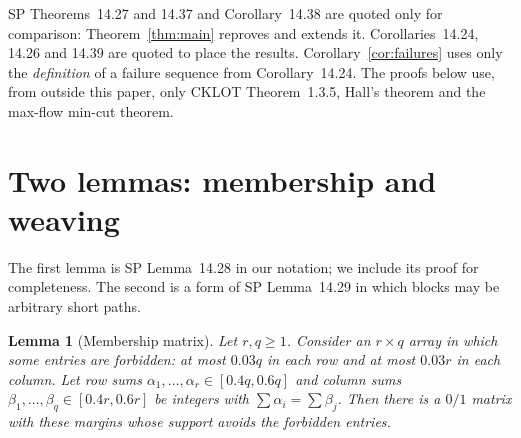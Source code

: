 \documentclass[11pt]{article}
\newtheorem{lemma}[theorem]{Lemma}
\theoremstyle{definition}
\begin{document}
SP Theorems~14.27 and 14.37 and Corollary~14.38 are quoted only for comparison: Theorem~\ref{thm:main} reproves and extends it. Corollaries~14.24, 14.26 and 14.39 are quoted to place the results. Corollary~\ref{cor:failures} uses only the \emph{definition} of a failure sequence from Corollary~14.24. The proofs below use, from outside this paper, only CKLOT Theorem~1.3.5, Hall's theorem and the max-flow min-cut theorem.

\section{Two lemmas: membership and weaving}\label{sec:tools}

The first lemma is SP Lemma~14.28 in our notation; we include its proof for completeness. The second is a form of SP Lemma~14.29 in which blocks may be arbitrary short paths.

\begin{lemma}[Membership matrix]\label{lem:matrix}
Let $r,q\ge1$. Consider an $r\times q$ array in which some entries are \emph{forbidden}: at most $0.03q$ in each row and at most $0.03r$ in each column. Let row sums $\alpha_1,\dots,\alpha_r\in[0.4q,0.6q]$ and column sums $\beta_1,\dots,\beta_q\in[0.4r,0.6r]$ be integers with $\sum\alpha_i=\sum\beta_j$. Then there is a $0/1$ matrix with these margins whose support avoids the forbidden entries.
\end{lemma}
\end{document}
